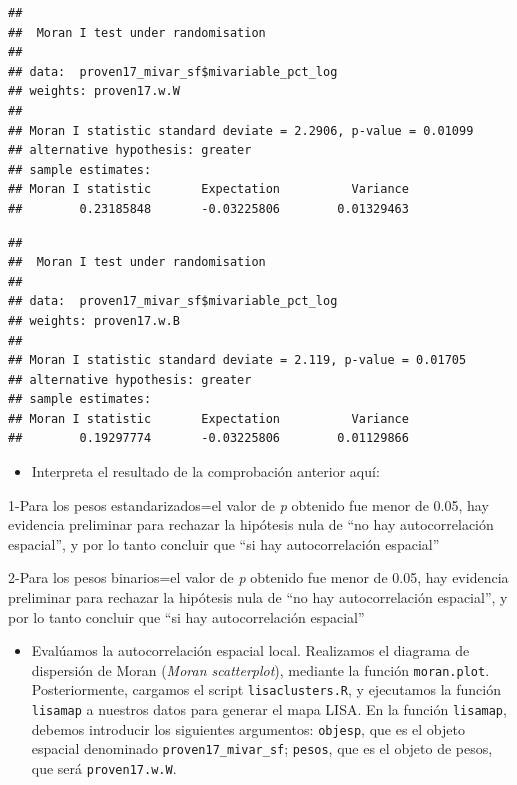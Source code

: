\documentclass[11pt,]{article}
\newenvironment{Shaded}{\begin{snugshade}}{\end{snugshade}}
\newcommand{\KeywordTok}[1]{\textcolor[rgb]{0.13,0.29,0.53}{\textbf{#1}}}
\newcommand{\DataTypeTok}[1]{\textcolor[rgb]{0.13,0.29,0.53}{#1}}
\newcommand{\StringTok}[1]{\textcolor[rgb]{0.31,0.60,0.02}{#1}}
\newcommand{\OperatorTok}[1]{\textcolor[rgb]{0.81,0.36,0.00}{\textbf{#1}}}
\newcommand{\NormalTok}[1]{#1}
\providecommand{\tightlist}{%
\setlength{\itemsep}{0pt}\setlength{\parskip}{0pt}}
\begin{document}
\begin{verbatim}
## 
##  Moran I test under randomisation
## 
## data:  proven17_mivar_sf$mivariable_pct_log  
## weights: proven17.w.W    
## 
## Moran I statistic standard deviate = 2.2906, p-value = 0.01099
## alternative hypothesis: greater
## sample estimates:
## Moran I statistic       Expectation          Variance 
##        0.23185848       -0.03225806        0.01329463
\end{verbatim}

\begin{Shaded}
\end{Shaded}

\begin{verbatim}
## 
##  Moran I test under randomisation
## 
## data:  proven17_mivar_sf$mivariable_pct_log  
## weights: proven17.w.B    
## 
## Moran I statistic standard deviate = 2.119, p-value = 0.01705
## alternative hypothesis: greater
## sample estimates:
## Moran I statistic       Expectation          Variance 
##        0.19297774       -0.03225806        0.01129866
\end{verbatim}

\begin{itemize}
\tightlist
\item
  Interpreta el resultado de la comprobación anterior aquí:
\end{itemize}

1-Para los pesos estandarizados=el valor de \emph{p} obtenido fue menor
de 0.05, hay evidencia preliminar para rechazar la hipótesis nula de
``no hay autocorrelación espacial'', y por lo tanto concluir que ``si
hay autocorrelación espacial''

2-Para los pesos binarios=el valor de \emph{p} obtenido fue menor de
0.05, hay evidencia preliminar para rechazar la hipótesis nula de ``no
hay autocorrelación espacial'', y por lo tanto concluir que ``si hay
autocorrelación espacial''

\begin{itemize}
\tightlist
\item
  Evalúamos la autocorrelación espacial local. Realizamos el diagrama de
  dispersión de Moran (\emph{Moran scatterplot}), mediante la función
  \texttt{moran.plot}. Posteriormente, cargamos el script
  \texttt{lisaclusters.R}, y ejecutamos la función \texttt{lisamap} a
  nuestros datos para generar el mapa LISA. En la función
  \texttt{lisamap}, debemos introducir los siguientes argumentos:
  \texttt{objesp}, que es el objeto espacial denominado
  \texttt{proven17\_mivar\_sf}; \texttt{pesos}, que es el objeto de
  pesos, que será \texttt{proven17.w.W}.
\end{itemize}
\end{document}
